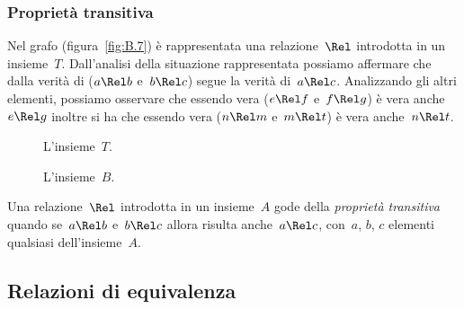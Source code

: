 \subsubsection{Proprietà transitiva}

\begin{exrig}
 \begin{esempio}

Nel grafo (figura~\ref{fig:B.7}) è rappresentata una relazione~$\Rel$ introdotta 
in un insieme~$T$. Dall'analisi della situazione rappresentata possiamo
affermare che dalla verità di ($a \Rel b$ e~$b \Rel c$) segue la verità di~$a 
\Rel c$. Analizzando gli altri elementi, 
possiamo osservare che essendo vera ($e \Rel f$ e~$f \Rel g$) è vera anche~$e 
\Rel g$
inoltre si ha che essendo vera ($n \Rel m$ e~$m \Rel t$) è vera anche~$n \Rel 
t$.
 \end{esempio}
\end{exrig}

\begin{inaccessibleblock}
 \begin{figure}[t]
\begin{minipage}[b]{.45\textwidth}
 \centering
 
 \caption{L'insieme~$T$.}\label{fig:B.7}
\end{minipage}\hfil
\begin{minipage}[b]{.45\textwidth}
 \centering
 
 \caption{L'insieme~$B$.}\label{fig:B.8}
\end{minipage}


\end{figure}
\end{inaccessibleblock}

\begin{definizione}
Una relazione~$\Rel$ introdotta in un insieme~$A$ gode della \emph{proprietà 
transitiva} quando se~$a \Rel b$ e~$b \Rel c$
allora risulta anche~$a \Rel c$, con~$a$, $b$, $c$ elementi qualsiasi 
dell'insieme~$A$.
\end{definizione}


\subsection{Relazioni di equivalenza}
\label{subsec:rel_equivalenza}

